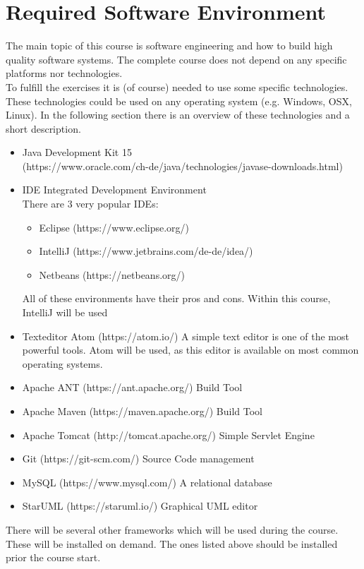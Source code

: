 
\section{Required Software Environment}
The main topic of this course is software engineering and how
to build high quality software systems. The complete course does
not depend on any specific platforms nor technologies.\\
To fulfill the exercises it is (of course) needed to use
some specific technologies. These technologies could be used
on any operating system (e.g. Windows, OSX, Linux). In the
following section there is an overview of these technologies and
a short description.\\

\begin{itemize}
\item Java Development Kit 15\\
(https://www.oracle.com/ch-de/java/technologies/javase-downloads.html)
\item IDE Integrated Development Environment\\
There are 3 very popular IDEs:
\begin{itemize}
\item Eclipse (https://www.eclipse.org/)
\item IntelliJ (https://www.jetbrains.com/de-de/idea/)
\item Netbeans (https://netbeans.org/)
\end{itemize}
All of these environments have their pros and cons. Within this course, IntelliJ
will be used
\item Texteditor Atom (https://atom.io/)
A simple text editor is one of the most powerful tools. Atom will be used, as
this editor is available on most common operating systems.
\item Apache ANT (https://ant.apache.org/)
Build Tool
\item Apache Maven (https://maven.apache.org/)
Build Tool
\item Apache Tomcat (http://tomcat.apache.org/)
Simple Servlet Engine
\item Git (https://git-scm.com/)
Source Code management
\item MySQL (https://www.mysql.com/)
A relational database
\item StarUML (https://staruml.io/)
Graphical UML editor
\end{itemize}

\vspace{1mm}

There will be several other frameworks which will be used during the course.
These will be installed on demand. The ones listed above should be installed
prior the course start.
